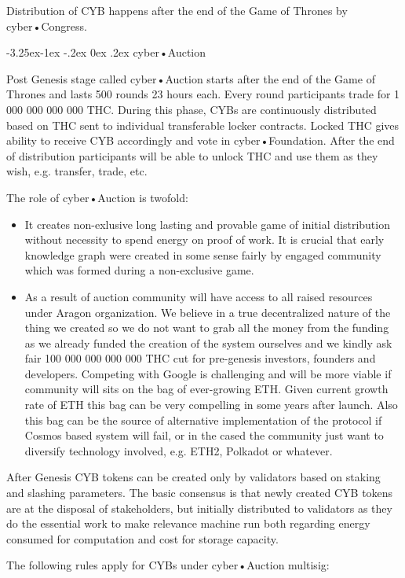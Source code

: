 \documentclass[8pt,oneside]{amsart}
\makeatletter
\renewcommand\subsection{\@startsection{subsection}{2}{\z@}%
                                     {-3.25ex\@plus -1ex \@minus -.2ex}%
                                     {0ex \@plus .2ex}%
                                     {\play\Large}}%
\newcommand{\titleSection}[1]{\subsection{#1}}
\makeatother
\begin{document}
Distribution of CYB happens after the end of the Game of Thrones by cyber•Congress.

\titleSection{cyber•Auction}\label{cyberauction}

Post Genesis stage called cyber•Auction starts after the end of the Game of Thrones and lasts 500 rounds 23 hours each. Every round participants trade for 1 000 000 000 000 THC. During this phase, CYBs are continuously distributed based on THC sent to individual transferable locker contracts. Locked THC gives ability to receive CYB accordingly and vote in cyber•Foundation. After the end of distribution participants will be able to unlock THC and use them as they wish, e.g. transfer, trade, etc.

The role of cyber•Auction is twofold:

\begin{itemize}
\item  It creates non-exlusive long lasting and provable game of initial distribution without necessity to spend energy on proof of work. It is crucial that early knowledge graph were created in some sense fairly by engaged community which was formed during a non-exclusive game.
\item  As a result of auction community will have access to all raised resources under Aragon organization. We believe in a true decentralized nature of the thing we created so we do not want to grab all the money from the funding as we already funded the creation of the system ourselves and we kindly ask fair 100 000 000 000 000  THC cut for pre-genesis investors, founders and developers. Competing with Google is challenging and will be more viable if community will sits on the bag of ever-growing ETH. Given current growth rate of ETH this bag can be very compelling in some years after launch. Also this bag can be the source of alternative implementation of the protocol if Cosmos based system will fail, or in the cased the community just want to diversify technology involved, e.g. ETH2, Polkadot or whatever.
\end{itemize}

After Genesis CYB tokens can be created only by validators based on staking and slashing parameters. The basic consensus is that newly created CYB tokens are at the disposal of stakeholders, but initially distributed to validators as they do the essential work to make relevance machine run both regarding energy consumed for computation and cost for storage capacity.

The following rules apply for CYBs under cyber•Auction multisig:
\end{document}
